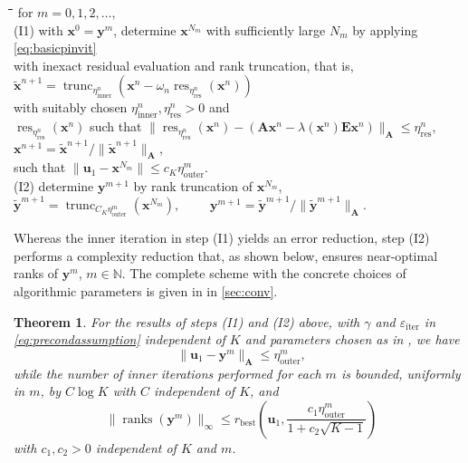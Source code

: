 \documentclass[a4paper,11pt,oneside]{amsart}
\DeclareMathOperator{\ranks}{ranks}
\providecommand{\norm}[1]{\lVert#1\rVert}
\newtheorem{theorem}{Theorem}
\theoremstyle{definition}
\theoremstyle{remark}
\newcommand{\N}{\mathbb{N}}
\newcommand{\ten}[1]{\boldsymbol{#1}}
\newcommand{\eiter}{\ensuremath{\varepsilon_{\mathrm{iter}}}}
\newcommand{\etain}{\eta_{\mathrm{inner}}}
\newcommand{\etares}{\eta_{\mathrm{res}}}
\newcommand{\etaout}{\eta_{\mathrm{outer}}}
\numberwithin{equation}{section}
\numberwithin{theorem}{section}
\begin{document}
\begin{tabbing}
 \hspace{9pt}\=\hspace{18pt}\=\hspace{24pt}\=\hspace{18pt}\=\hspace{18pt}\=\kill 
 \> for $m = 0, 1, 2,\ldots$, \\[3pt]
 \> \> (I1)\> with $\ten x^0 = \ten y^m$, determine $\ten x^{N_m}$ with sufficiently large $N_m$ by applying \cref{eq:basicpinvit}\\
 \> \>  \> with inexact residual evaluation and rank truncation, that is,   \\[6pt]
 \> \> \> \> $\ten{\tilde x}^{n+1} = \operatorname{trunc}_{\etain^n}(\ten{x}^n - \omega_n  \operatorname{res}_{\etares^n}(\ten{x}^n)) $ \\
 \> \> \> \> \>with suitably chosen $\etain^n,\etares^n>0$ and\\
 \> \> \> \> \> $\operatorname{res}_{\etares^n}(\ten{x}^n)$ such that $\norm{\operatorname{res}_{\etares^n}(\ten{x}^n) - (\ten A \ten x^n - \lambda(\ten x^n) \ten E \ten x^n)}_{\ten A} \leq \etares^n$,  \\[3pt]
 \> \> \> \> $\ten x^{n+1} = \ten{\tilde x}^{n+1}  / \norm{\ten{\tilde x}^{n+1} }_{\ten A}$, \\[3pt]
 \>\>\> such that $\norm{ \ten u_1 - \ten x^{N_m}} \leq c_K \etaout^m$.\\[6pt]
 \> \>  (I2)\> determine $\ten y^{m+1}$ by rank truncation of $\ten x^{N_m}$,\\[3pt]
 \>\>\>\> $\ten{\tilde y}^{m+1} = \operatorname{trunc}_{C_K \etaout^m} ( \ten x^{N_m} ),\qquad$ $\ten y^{m+1} = \ten{\tilde y}^{m+1} / \norm{ \ten{\tilde y}^{m+1} }_{\ten A}.$
\end{tabbing}
Whereas the inner iteration in step (I1) yields an error reduction, step (I2) performs a complexity reduction that, as shown below, ensures near-optimal ranks of $\ten y^m$, $m \in \N$.
%
The complete scheme with the concrete choices of algorithmic parameters is given in  in \cref{sec:conv}.

\begin{theorem}\label{thm:main}
For the results of steps {\rm (I1)} and {\rm (I2)} above, with $\gamma$ and $\eiter$ in \eqref{eq:precondassumption} independent of $K$ and  parameters chosen as in , 
we have
\[
  \norm{ \ten u_1 - \ten y^m }_{\ten A} \leq \etaout^m,
\]
while the number of inner iterations performed for each $m$ is bounded, uniformly in $m$, by $C \log K$ with $C$ independent of $K$, and
\[
   \norm{\ranks(\ten y^m)}_\infty \leq r_\mathrm{best} \left(\ten u_1, \frac{c_1 \etaout^m }{1 + c_2 \sqrt{K-1}}  \right)
\]
with $c_1, c_2>0$ independent of $K$ and $m$. 
\end{theorem}
\end{document}
